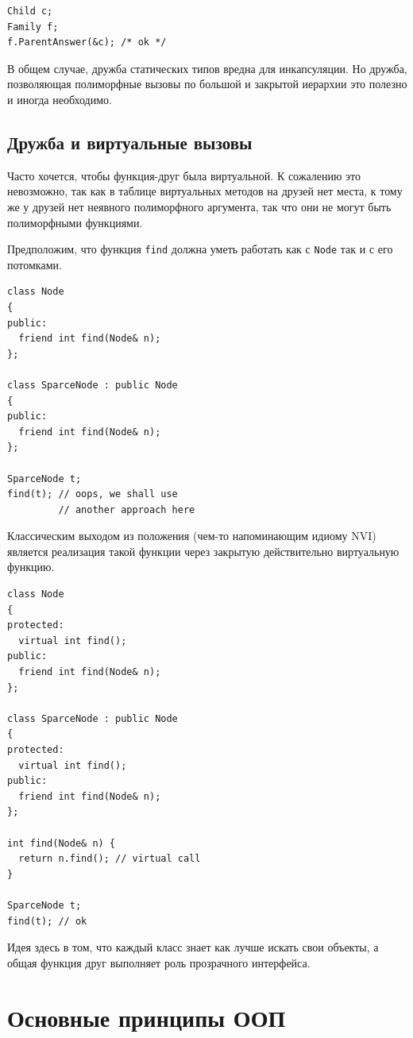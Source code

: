 \documentclass[a4paper,12pt,oneside]{book}
\begin{document}
\begin{lstlisting}
Child c;
Family f;
f.ParentAnswer(&c); /* ok */
\end{lstlisting}

В общем случае, дружба статических типов вредна для инкапсуляции. Но дружба, позволяющая полиморфные вызовы по большой и закрытой иерархии это полезно и иногда необходимо. 

\subsection{Дружба и виртуальные вызовы}

Часто хочется, чтобы функция-друг была виртуальной. К сожалению это невозможно, так как в таблице виртуальных методов на друзей нет места, к тому же у друзей нет неявного полиморфного аргумента, так что они не могут быть полиморфными функциями.

Предположим, что функция \lstinline!find! должна уметь работать как с \lstinline!Node! так и с его потомками.

\begin{lstlisting}
class Node
{
public:
  friend int find(Node& n);
};

class SparceNode : public Node
{
public:
  friend int find(Node& n);
};

SparceNode t;
find(t); // oops, we shall use 
         // another approach here
\end{lstlisting}

Классическим выходом из положения (чем-то напоминающим идиому NVI) является реализация такой функции через закрытую действительно виртуальную функцию.

\begin{lstlisting}
class Node
{
protected:
  virtual int find();
public:
  friend int find(Node& n);
};

class SparceNode : public Node
{
protected:
  virtual int find();
public:
  friend int find(Node& n);
};

int find(Node& n) {
  return n.find(); // virtual call
}

SparceNode t;
find(t); // ok
\end{lstlisting}

Идея здесь в том, что каждый класс знает как лучше искать свои объекты, а общая функция друг выполняет роль прозрачного интерфейса.

\pagebreak
\section{Основные принципы ООП}\label{SOLID}
\end{document}
